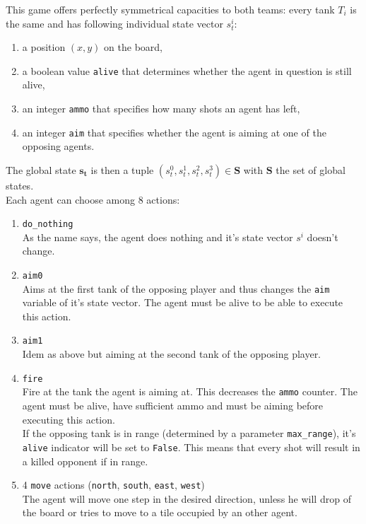 This game offers perfectly symmetrical capacities to both teams: every tank $T_i$ is the same and has following individual state vector $s^i_t$:
\begin{enumerate}
    \item a position $(x,y)$ on the board,
    \item a boolean value {\tt alive} that determines whether the agent in question is still alive,
    \item an integer {\tt ammo} that specifies how many shots an agent has left,
    \item an integer {\tt aim} that specifies whether the agent is aiming at one of the opposing agents.
\end{enumerate}
The global state $\bm{s_t}$ is then a tuple $(s_t^0, s_t^1, s_t^2, s_t^3) \in \bm{S}$ with $\bm{S}$ the set of global states.\\
Each agent can choose among $8$ actions:
\begin{enumerate}
    \item {\tt do\_nothing}\\
        As the name says, the agent does nothing and it's state vector $s^i$ doesn't change.
    \item {\tt aim0} \\
        Aims at the first tank of the opposing player and thus changes the {\tt aim} variable of it's state vector. The agent must be alive to be able to execute this action.
    \item {\tt aim1} \\
        Idem as above but aiming at the second tank of the opposing player.
    \item {\tt fire} \\
        Fire at the tank the agent is aiming at. This decreases the {\tt ammo} counter. The agent must be alive, have sufficient ammo and must be aiming before executing this action.\\
        If the opposing tank is in range (determined by a parameter {\tt max\_range}), it's {\tt alive} indicator will be set to {\tt False}. This means that every shot will result in a killed opponent if in range.
    \item 4 {\tt move} actions ({\tt north}, {\tt south}, {\tt east}, {\tt west})\\
        The agent will move one step in the desired direction, unless he will drop of the board or tries to move to a tile occupied by an other agent.
\end{enumerate}

